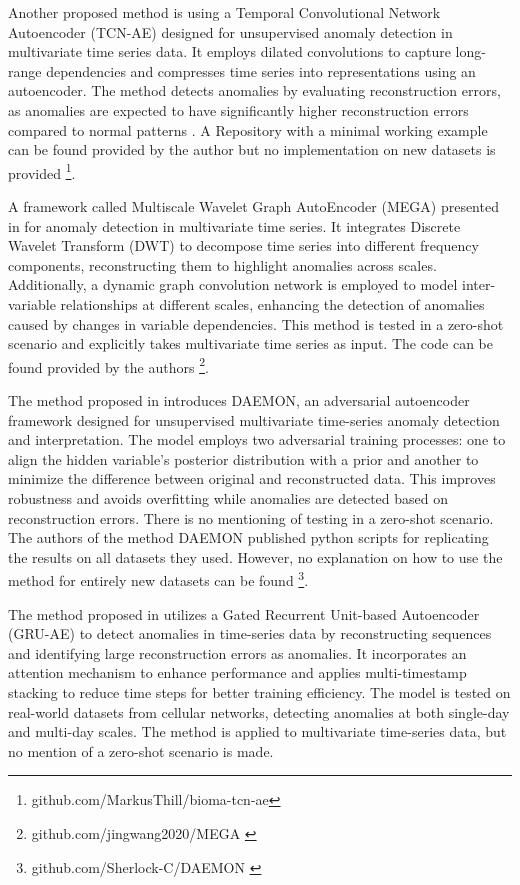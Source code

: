 Another proposed method is using a Temporal Convolutional Network Autoencoder (TCN-AE) designed for unsupervised anomaly detection in multivariate time series data. It employs dilated convolutions to capture long-range dependencies and compresses time series into representations using an autoencoder. The method detects anomalies by evaluating reconstruction errors, as anomalies are expected to have significantly higher reconstruction errors compared to normal patterns \cite{thill_temporal_2021}. A Repository with a minimal working example can be found provided by the author but no implementation on new datasets is provided \footnote{\fussy\tiny github.com/MarkusThill/bioma-tcn-ae}.

A framework called Multiscale Wavelet Graph AutoEncoder (MEGA) presented in \cite{wang_multiscale_2023} for anomaly detection in multivariate time series. It integrates Discrete Wavelet Transform (DWT) to decompose time series into different frequency components, reconstructing them to highlight anomalies across scales. Additionally, a dynamic graph convolution network is employed to model inter-variable relationships at different scales, enhancing the detection of anomalies caused by changes in variable dependencies.
This method is tested in a zero-shot scenario and explicitly takes multivariate time series as input. The code can be found provided by the authors \footnote{\fussy\tiny github.com/jingwang2020/MEGA \label{foot_mega}}.

The method proposed in \cite{chen_adversarial_2023} introduces DAEMON, an adversarial autoencoder framework designed for unsupervised multivariate time-series anomaly detection and interpretation. The model employs two adversarial training processes: one to align the hidden variable’s posterior distribution with a prior and another to minimize the difference between original and reconstructed data. This improves robustness and avoids overfitting while anomalies are detected based on reconstruction errors. There is no mentioning of testing in a zero-shot scenario.
The authors of the method DAEMON published python scripts for replicating the results on all datasets they used. However, no explanation on how to use the method for entirely new datasets can be found \footnote{\fussy\tiny github.com/Sherlock-C/DAEMON \label{foot_daemon}}.


The method proposed in \cite{gong_autoencoder-based_2022} utilizes a Gated Recurrent Unit-based Autoencoder (GRU-AE) to detect anomalies in time-series data by reconstructing sequences and identifying large reconstruction errors as anomalies. It incorporates an attention mechanism to enhance performance and applies multi-timestamp stacking to reduce time steps for better training efficiency. The model is tested on real-world datasets from cellular networks, detecting anomalies at both single-day and multi-day scales. The method is applied to multivariate time-series data, but no mention of a zero-shot scenario is made.

